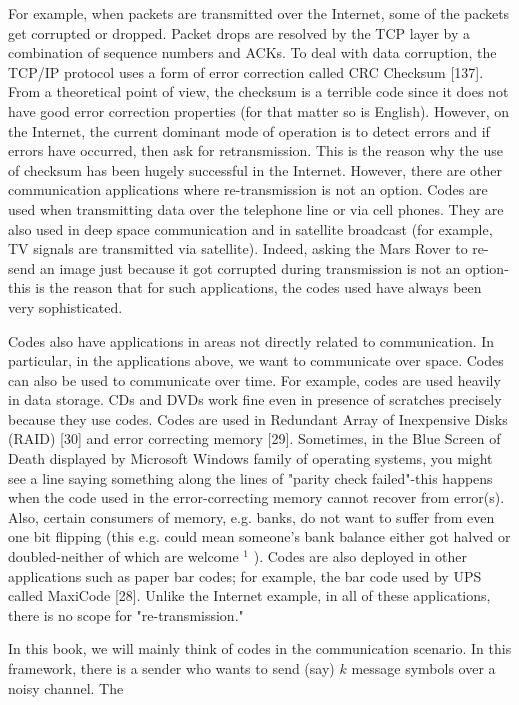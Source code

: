 \documentclass[10pt]{article}
\begin{document}
For example, when packets are transmitted over the Internet, some of the packets get corrupted or dropped. Packet drops are resolved by the TCP layer by a combination of sequence numbers and ACKs. To deal with data corruption, the TCP/IP protocol uses a form of error correction called CRC Checksum [137]. From a theoretical point of view, the checksum is a terrible code since it does not have good error correction properties (for that matter so is English). However, on the Internet, the current dominant mode of operation is to detect errors and if errors have occurred, then ask for retransmission. This is the reason why the use of checksum has been hugely successful in the Internet. However, there are other communication applications where re-transmission is not an option. Codes are used when transmitting data over the telephone line or via cell phones. They are also used in deep space communication and in satellite broadcast (for example, TV signals are transmitted via satellite). Indeed, asking the Mars Rover to re-send an image just because it got corrupted during transmission is not an option-this is the reason that for such applications, the codes used have always been very sophisticated.

Codes also have applications in areas not directly related to communication. In particular, in the applications above, we want to communicate over space. Codes can also be used to communicate over time. For example, codes are used heavily in data storage. CDs and DVDs work fine even in presence of scratches precisely because they use codes. Codes are used in Redundant Array of Inexpensive Disks (RAID) [30] and error correcting memory [29]. Sometimes, in the Blue Screen of Death displayed by Microsoft Windows family of operating systems, you might see a line saying something along the lines of "parity check failed"-this happens when the code used in the error-correcting memory cannot recover from error(s). Also, certain consumers of memory, e.g. banks, do not want to suffer from even one bit flipping (this e.g. could mean someone's bank balance either got halved or doubled-neither of which are welcome ${ }^{1}$ ). Codes are also deployed in other applications such as paper bar codes; for example, the bar code used by UPS called MaxiCode [28]. Unlike the Internet example, in all of these applications, there is no scope for "re-transmission."

In this book, we will mainly think of codes in the communication scenario. In this framework, there is a sender who wants to send (say) $k$ message symbols over a noisy channel. The
\end{document}
